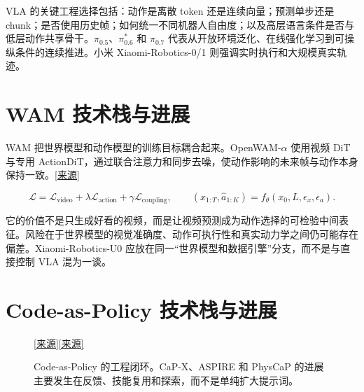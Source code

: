 \documentclass[UTF8,a4paper,11pt]{ctexart}
\newcommand{\source}[1]{\href{#1}{[来源]}}
\begin{document}
VLA 的关键工程选择包括：动作是离散 token 还是连续向量；预测单步还是 chunk；是否使用历史帧；如何统一不同机器人自由度；以及高层语言条件是否与低层动作共享骨干。$\pi_{0.5}$、$\pi^*_{0.6}$ 和 $\pi_{0.7}$ 代表从开放环境泛化、在线强化学习到可操纵条件的连续推进。小米 Xiaomi-Robotics-0/1 则强调实时执行和大规模真实轨迹。

\section{WAM 技术栈与进展}
WAM 把世界模型和动作模型的训练目标耦合起来。OpenWAM-$\alpha$ 使用视频 DiT 与专用 ActionDiT，通过联合注意力和同步去噪，使动作影响的未来帧与动作本身保持一致。\source{https://openwam-official.github.io/}

\[
 \mathcal{L}=\mathcal{L}_{\mathrm{video}}+\lambda\mathcal{L}_{\mathrm{action}}+\gamma\mathcal{L}_{\mathrm{coupling}},
 \qquad
 (\hat{x}_{1:T},\hat{a}_{1:K})=f_\theta(x_0,L,\epsilon_x,\epsilon_a).
\]

它的价值不是只生成好看的视频，而是让视频预测成为动作选择的可检验中间表征。风险在于世界模型的视觉准确度、动作可执行性和真实动力学之间仍可能存在偏差。Xiaomi-Robotics-U0 应放在同一“世界模型和数据引擎”分支，而不是与直接控制 VLA 混为一谈。

\section{Code-as-Policy 技术栈与进展}
\begin{figure}[ht]
\centering
{}
\caption{Code-as-Policy 的工程闭环。CaP-X、ASPIRE 和 PhysCaP 的进展主要发生在反馈、技能复用和探索，而不是单纯扩大提示词。}\source{https://code-as-policies.github.io/}\;\source{https://capgym.github.io/}
\end{figure}
\end{document}
